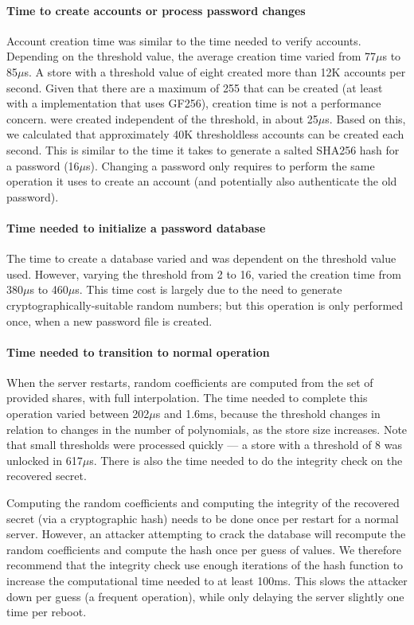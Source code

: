 \paragraph{Time to create accounts or process password changes}
Account creation time was similar to the time needed to verify accounts.
Depending on the threshold value, the average creation time varied from
77$\mu$s to 85$\mu$s. A \PPH store with a threshold value of eight created more
than 12K accounts per second. Given that there are a maximum of 255
\thresholdaccounts that can be created (at least with a \PPH implementation
that uses GF256), \thresholdaccount  creation time is not a performance
concern.  \Thresholdlessaccounts were created independent of the threshold, in
about 25$\mu$s. Based on this, we calculated that approximately 40K
thresholdless accounts can be created each second. This is similar to the time
it takes to generate a salted SHA256 hash for a password (16$\mu$s).  Changing
a password only requires \PPH to perform the same operation it uses to
create an account (and potentially also authenticate the old password).

\paragraph{Time needed to initialize a password database} The time to create a
database varied and was dependent on the threshold value used.  However,
varying the threshold from 2 to 16, varied the creation time from 380$\mu$s to
460$\mu$s. This time cost is largely due to the need to generate
cryptographically-suitable random numbers; but this operation is only
performed once, when a new password file is created.


\paragraph{Time needed to transition to normal operation} When the
server restarts, random coefficients are computed from the set of provided
shares, with full interpolation. The time needed to complete this operation
varied between 202$\mu$s and 1.6ms, because the threshold changes in relation to
changes in the number of polynomials, as the store size increases.  Note that
small thresholds were processed quickly --- a store with a threshold of 8 was
unlocked in 617$\mu$s.  There is also the time needed to do the integrity
check on the recovered secret.

Computing the random coefficients and computing the integrity
of the recovered secret (via a cryptographic hash) needs to be done once per 
restart for a normal server.  However, an attacker attempting to crack the
database will recompute the random coefficients and compute the hash once
per guess of \thresholdaccount values.  We therefore recommend that the 
integrity check use enough iterations of the hash function to increase the 
computational time needed to at least 100ms.   This slows the attacker
down per guess (a frequent operation), while only delaying the server slightly
one time per reboot.


